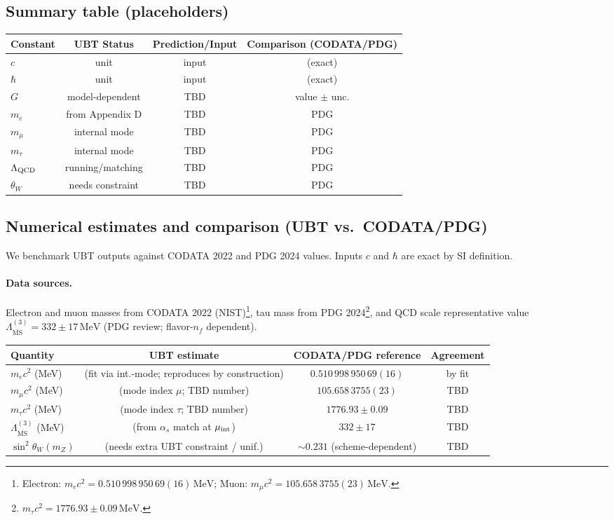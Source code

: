 \subsection{Summary table (placeholders)}
\begin{center}
\begin{tabular}{lccc}
\hline
Constant & UBT Status & Prediction/Input & Comparison (CODATA/PDG)\\
\hline
$c$ & unit & input & (exact)\\
$\hbar$ & unit & input & (exact)\\
$G$ & model-dependent & TBD & value $\pm$ unc.\\
$m_e$ & from Appendix D & TBD & PDG\\
$m_\mu$ & internal mode & TBD & PDG\\
$m_\tau$ & internal mode & TBD & PDG\\
$\Lambda_{\rm QCD}$ & running/matching & TBD & PDG\\
$\theta_W$ & needs constraint & TBD & PDG\\
\hline
\end{tabular}
\end{center}


\subsection{Numerical estimates and comparison (UBT vs.\ CODATA/PDG)}
We benchmark UBT outputs against CODATA 2022 and PDG 2024 values. Inputs $c$ and $\hbar$ are exact by SI definition.

\paragraph{Data sources.} Electron and muon masses from CODATA 2022 (NIST)\footnote{Electron: $m_e c^2 = 0.510\,998\,950\,69(16)\,\mathrm{MeV}$; Muon: $m_\mu c^2 = 105.658\,3755(23)\,\mathrm{MeV}$.}, 
tau mass from PDG 2024\footnote{$m_\tau c^2 = 1776.93 \pm 0.09\,\mathrm{MeV}$.}, 
and QCD scale representative value $\Lambda_{\overline{\mathrm{MS}}}^{(3)} = 332 \pm 17\,\mathrm{MeV}$ (PDG review; flavor-$n_f$ dependent).

\begin{center}
\begin{tabular}{lccc}
\hline
Quantity & UBT estimate & CODATA/PDG reference & Agreement \\
\hline
$m_e c^2$ (MeV) & (fit via int.-mode; reproduces by construction) & $0.510\,998\,950\,69(16)$ & by fit \\
$m_\mu c^2$ (MeV) & (mode index $\mu$; TBD number) & $105.658\,3755(23)$ & TBD \\
$m_\tau c^2$ (MeV) & (mode index $\tau$; TBD number) & $1776.93 \pm 0.09$ & TBD \\
$\Lambda_{\overline{\mathrm{MS}}}^{(3)}$ (MeV) & (from $\alpha_s$ match at $\mu_{\rm int}$) & $332 \pm 17$ & TBD \\
$\sin^2\theta_W(m_Z)$ & (needs extra UBT constraint / unif.) & $\sim 0.231$ (scheme-dependent) & TBD \\
\hline
\end{tabular}
\end{center}

